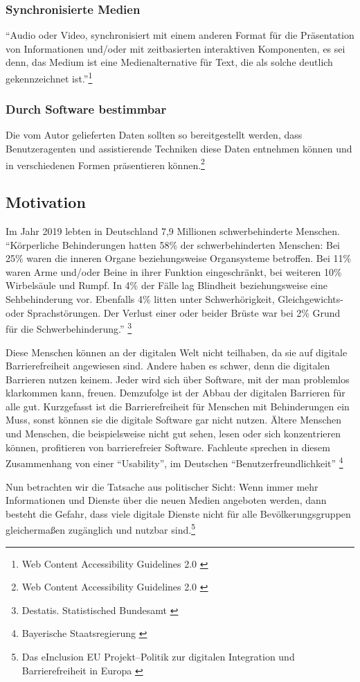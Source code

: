 \subsubsection{Synchronisierte Medien}
"`Audio oder Video, synchronisiert mit einem anderen Format für die Präsentation von Informationen und/oder mit zeitbasierten interaktiven 
Komponenten, es sei denn, das Medium ist eine Medienalternative für Text, die als solche deutlich gekennzeichnet 
ist."'\footnote{Web Content Accessibility Guidelines 2.0 \cite{WCAG2.0}}

\subsubsection{Durch Software bestimmbar}
Die vom Autor gelieferten Daten sollten so bereitgestellt werden, dass Benutzeragenten und assistierende Techniken diese Daten entnehmen können und in verschiedenen
Formen präsentieren können.\footnote{Web Content Accessibility Guidelines 2.0 \cite{WCAG2.0}}

\subsection{Motivation}
\label{subsec: Motivation}

Im Jahr 2019 lebten in Deutschland 7,9 Millionen schwerbehinderte Menschen. "`Körperliche Behinderungen hatten 58\% der schwerbehinderten Menschen: Bei 25\% waren die inneren Organe beziehungsweise Organsysteme betroffen. Bei 11\% waren Arme und/oder Beine in ihrer Funktion eingeschränkt, bei weiteren 10\% Wirbelsäule und Rumpf. In 4\% der Fälle lag Blindheit beziehungsweise eine Sehbehinderung vor. Ebenfalls 4\% litten unter Schwerhörigkeit, Gleichgewichts- oder Sprachstörungen. Der Verlust einer oder beider Brüste war bei 2\% Grund für die Schwerbehinderung."' \footnote{Destatis. Statistisched Bundesamt \cite{DESTATIS}}

Diese Menschen können an der digitalen Welt nicht teilhaben, da sie auf digitale Barrierefreiheit angewiesen sind. Andere haben es schwer, denn die digitalen Barrieren nutzen keinem. Jeder wird sich über Software, mit der man problemlos klarkommen kann, freuen. Demzufolge ist der Abbau der digitalen Barrieren für alle gut. Kurzgefasst ist die Barrierefreiheit für Menschen mit Behinderungen ein Muss, sonst können sie die digitale Software gar nicht nutzen. Ältere Menschen und Menschen, die beispielsweise nicht gut sehen, lesen oder sich konzentrieren können, profitieren von barrierefreier Software. Fachleute sprechen in diesem Zusammenhang von einer "`Usability"', im Deutschen "`Benutzerfreundlichkeit"' \footnote{Bayerische Staatsregierung \cite{BS}}

Nun betrachten wir die Tatsache aus politischer Sicht: Wenn immer mehr Informationen und Dienste über die neuen Medien angeboten werden, dann besteht die Gefahr, dass viele digitale Dienste nicht für alle Bevölkerungsgruppen gleichermaßen zugänglich und nutzbar sind.\footnote{Das eInclusion EU Projekt--Politik zur digitalen Integration und Barrierefreiheit in Europa \cite{redingeinclusion}}